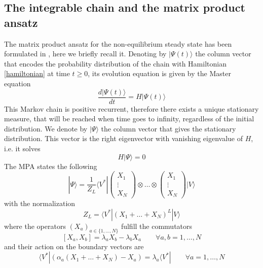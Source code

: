 \documentclass[10pt]{article}
\numberwithin{equation}{section}
\numberwithin{equation}{subsection}
\begin{document}
\subsection{The integrable chain and the matrix product ansatz}
The matrix product ansatz for the non-equilibrium steady state has been formulated in \cite{vanicat2017exact}, here we briefly recall it.
 Denoting by $|\Psi(t)\rangle$ the column vector that encodes the probability distribution of the chain with Hamiltonian \eqref{hamiltonian} at time $t\geq 0$, its evolution equation is given by 
 the Master equation
\begin{equation}
    \frac{d|{\Psi}(t)\rangle}{dt}=H|{\Psi}(t)\rangle
\end{equation}
This Markov chain is positive recurrent, therefore there exists a unique stationary measure, that will be reached when time goes to infinity, regardless of the initial distribution. 
We denote by $|\Psi\rangle$ the column vector that gives the stationary distribution. This vector is the right eigenvector with vanishing eigenvalue of $H$, i.e. it solves 
\begin{equation}
	H|\Psi\rangle =0
\end{equation}
The MPA states the following
\begin{equation}
	|\Psi\rangle=\frac{1}{Z_{L}}\langle V^{*}|\begin{pmatrix}
		X_{1}\\
		\vdots\\
		X_{N}
	\end{pmatrix}\otimes \ldots\otimes \begin{pmatrix}
		X_{1}\\
		\vdots\\
		X_{N}
	\end{pmatrix}|V\rangle
\end{equation}
with the normalization 
\begin{equation}
	Z_{L}=\langle V^{*}|(X_{1}+\ldots +X_{N})^{L}|V\rangle
\end{equation}
where the operators $(X_{a})_{a\in \{1,\ldots,N\}}$ fulfill the commutators
\begin{equation}\label{bulk}
	\left[X_{a},X_{b}\right]=\lambda_{a}X_{b}-\lambda_{b}X_{a}\qquad\forall a,b=1,\ldots,N
\end{equation}
and their action on the boundary vectors are
\begin{equation}\label{leftBoundary}
	\langle V^{*}|\left(\alpha_{a}(X_{1}+\ldots+X_{N})-X_{a}\right)=\lambda_{a}\langle V^{*}|\qquad\forall a=1,\ldots,N
\end{equation}
\end{document}
